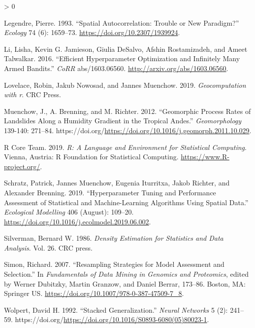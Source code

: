 \documentclass[
]{scrbook}
\newlength{\cslhangindent}
\newenvironment{CSLReferences}[2] %
 {%
  \setlength{\parindent}{0pt}
  \ifodd #1 \everypar{\setlength{\hangindent}{\cslhangindent}}\ignorespaces\fi
  \ifnum #2 > 0
  \setlength{\parskip}{#2\baselineskip}
  \fi
 }%
 {}
\begin{document}
\begin{CSLReferences}{1}{0}
\leavevmode\hypertarget{ref-legendre1993}{}%
Legendre, Pierre. 1993. {``Spatial Autocorrelation: Trouble or New Paradigm?''} \emph{Ecology} 74 (6): 1659--73. \url{https://doi.org/10.2307/1939924}.

\leavevmode\hypertarget{ref-Li2016}{}%
Li, Lisha, Kevin G. Jamieson, Giulia DeSalvo, Afshin Rostamizadeh, and Ameet Talwalkar. 2016. {``Efficient Hyperparameter Optimization and Infinitely Many Armed Bandits.''} \emph{CoRR} abs/1603.06560. \url{http://arxiv.org/abs/1603.06560}.

\leavevmode\hypertarget{ref-lovelace2019}{}%
Lovelace, Robin, Jakub Nowosad, and Jannes Muenchow. 2019. \emph{Geocomputation with r}. CRC Press.

\leavevmode\hypertarget{ref-muenchow2012}{}%
Muenchow, J., A. Brenning, and M. Richter. 2012. {``Geomorphic Process Rates of Landslides Along a Humidity Gradient in the Tropical Andes.''} \emph{Geomorphology} 139-140: 271--84. https://doi.org/\url{https://doi.org/10.1016/j.geomorph.2011.10.029}.

\leavevmode\hypertarget{ref-R}{}%
R Core Team. 2019. \emph{R: A Language and Environment for Statistical Computing}. Vienna, Austria: R Foundation for Statistical Computing. \url{https://www.R-project.org/}.

\leavevmode\hypertarget{ref-schratz2019}{}%
Schratz, Patrick, Jannes Muenchow, Eugenia Iturritxa, Jakob Richter, and Alexander Brenning. 2019. {``Hyperparameter Tuning and Performance Assessment of Statistical and Machine-Learning Algorithms Using Spatial Data.''} \emph{Ecological Modelling} 406 (August): 109--20. \url{https://doi.org/10.1016/j.ecolmodel.2019.06.002}.

\leavevmode\hypertarget{ref-Silverman1986}{}%
Silverman, Bernard W. 1986. \emph{Density Estimation for Statistics and Data Analysis}. Vol. 26. CRC press.

\leavevmode\hypertarget{ref-Simon2007}{}%
Simon, Richard. 2007. {``Resampling Strategies for Model Assessment and Selection.''} In \emph{Fundamentals of Data Mining in Genomics and Proteomics}, edited by Werner Dubitzky, Martin Granzow, and Daniel Berrar, 173--86. {Boston, MA}: {Springer US}. \url{https://doi.org/10.1007/978-0-387-47509-7_8}.

\leavevmode\hypertarget{ref-Wolpert1992}{}%
Wolpert, David H. 1992. {``Stacked Generalization.''} \emph{Neural Networks} 5 (2): 241--59. https://doi.org/\url{https://doi.org/10.1016/S0893-6080(05)80023-1}.

\end{CSLReferences}
\end{document}
